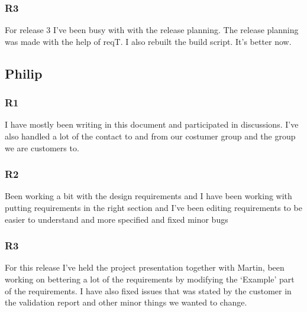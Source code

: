 \documentclass[a4paper]{article}
\begin{document}
		\subsubsection{R3}
		For release 3 I've been busy with with the release planning. The release planning was made with the help of reqT. I also rebuilt the build script. It's better now.

	\subsection{Philip}
		\subsubsection{R1}
	I have mostly been writing in this document and participated in discussions. I've also handled a lot of the contact to and from our costumer group and the group we are customers to.
		\subsubsection{R2}
		Been working a bit with the design requirements and I have been working with putting requirements in the right section and I've been editing requirements to be easier to understand and more specified and fixed minor bugs
		\subsubsection{R3}
		For this release I've held the project presentation together with Martin, been working on bettering a lot of the requirements by modifying the `Example' part of the requirements. I have also fixed issues that was stated by the customer in the validation report and other minor things we wanted to change. 
\end{document}
